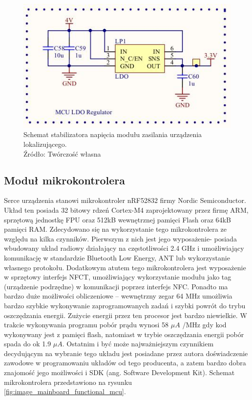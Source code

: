 \begin{figure}[H]
	\centering
	\includegraphics[width=12cm]{img/schematics/mainboard_power_ldo.jpg}
	\caption{Schemat stabilizatora napięcia modułu zasilania urządzenia lokalizującego. \\ Źródło: Twórczość własna}
	\label{fig:image_mainboard_power_ldo}
\end{figure}

\subsection{Moduł mikrokontrolera}

Serce urządzenia stanowi mikrokontroler nRF52832 firmy Nordic Semiconductor. Układ ten posiada 32 bitowy rdzeń Cortex-M4 zaprojektowany przez firmę ARM, sprzętową jednostkę FPU oraz 512kB wewnętrznej pamięci Flash oraz 64kB pamięci RAM. Zdecydowano się na wykorzystanie tego mikrokontrolera ze względu na kilka czynników. Pierwszym z nich jest jego wyposażenie- posiada wbudowany układ radiowy działający na częstotliwości 2.4 GHz i umożliwiający komunikację w standardzie Bluetooth Low Energy, ANT lub wykorzystanie własnego protokołu. Dodatkowym atutem tego mikrokontrolera jest wyposażenie w sprzętowy interfejs NFCT, umożliwiający wykorzystanie modułu jako tag (urządzenie podrzędne) w komunikacji poprzez interfejs NFC. Ponadto ma bardzo duże możliwości obliczeniowe – wewnętrzny zegar 64 MHz umożliwia bardzo szybkie wykonywanie zaprogramowanych zadań i szybki powrót do trybu oszczędzania energii. Zużycie energii przez ten procesor jest bardzo niewielkie. W trakcie wykonywania programu pobór prądu wynosi 58 $\mu A$ /MHz gdy kod wykonywany jest z pamięci flash, natomiast w trybie oszczędzania energii pobór spada do ok 1.9 $\mu A$. Ostatnim i być może najważniejszym czynnikiem decydującym na wybranie tego układu jest posiadane przez autora doświadczenie zawodowe w programowaniu układów od tego producenta, a zatem bardzo dobra znajomość jego możliwości i SDK (ang. Software Development Kit). Schemat mikrokontrolera przedstawiono na rysunku \ref{fig:image_mainboard_functional_mcu}.

